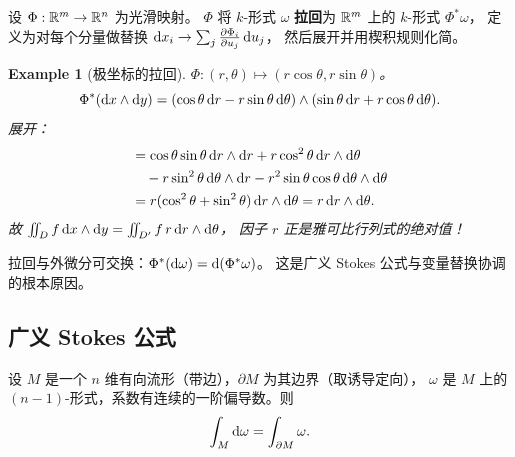 \documentclass{article}
\newtheorem{example}[theorem]{Example}
\begin{document}
\begin{definition}[拉回]
  设 $\Phi: \mathbb{R}^m \to \mathbb{R}^n$ 为光滑映射。
  $\Phi$ 将 $k$-形式 $\omega$ \textbf{拉回}为 $\mathbb{R}^m$ 上的 $k$-形式 $\Phi^*\omega$，
  定义为对每个分量做替换 $\mathrm{d} x_i \to \sum_j \frac{\partial \Phi_i}{\partial u_j}\,\mathrm{d} u_j$，
  然后展开并用楔积规则化简。
\end{definition}

\begin{example}[极坐标的拉回]
  $\Phi: (r,\theta) \mapsto (r\cos\theta, r\sin\theta)$。
  \[
    \Phi^*(\mathrm{d} x \wedge \mathrm{d} y)
    = (\cos\theta\,\mathrm{d} r - r\sin\theta\,\mathrm{d}\theta)
    \wedge (\sin\theta\,\mathrm{d} r + r\cos\theta\,\mathrm{d}\theta).
  \]
  展开：
  \begin{align*}
    &= \cos\theta\sin\theta\,\mathrm{d} r\wedge\mathrm{d} r
    + r\cos^2\theta\,\mathrm{d} r\wedge\mathrm{d}\theta \\
    &\quad - r\sin^2\theta\,\mathrm{d}\theta\wedge\mathrm{d} r
    - r^2\sin\theta\cos\theta\,\mathrm{d}\theta\wedge\mathrm{d}\theta \\
    &= r(\cos^2\theta+\sin^2\theta)\,\mathrm{d} r\wedge\mathrm{d}\theta
    = r\,\mathrm{d} r\wedge\mathrm{d}\theta.
  \end{align*}
  故 $\iint_D f\,\mathrm{d} x\wedge\mathrm{d} y = \iint_{D'} f\,r\,\mathrm{d} r\wedge\mathrm{d}\theta$，
  因子 $r$ 正是雅可比行列式的绝对值！
\end{example}

\begin{remark}[拉回与外微分交换]
  拉回与外微分可交换：$\Phi^*(\mathrm{d}\omega) = \mathrm{d}(\Phi^*\omega)$。
  这是广义 Stokes 公式与变量替换协调的根本原因。
\end{remark}

\subsection{广义 Stokes 公式}

\begin{theorem}[广义 Stokes 公式]
  设 $M$ 是一个 $n$ 维有向流形（带边），$\partial M$ 为其边界（取诱导定向），
  $\omega$ 是 $M$ 上的 $(n-1)$-形式，系数有连续的一阶偏导数。则
  \[
    \int_M \mathrm{d}\omega = \int_{\partial M} \omega.
  \]
\end{theorem}
\end{document}
